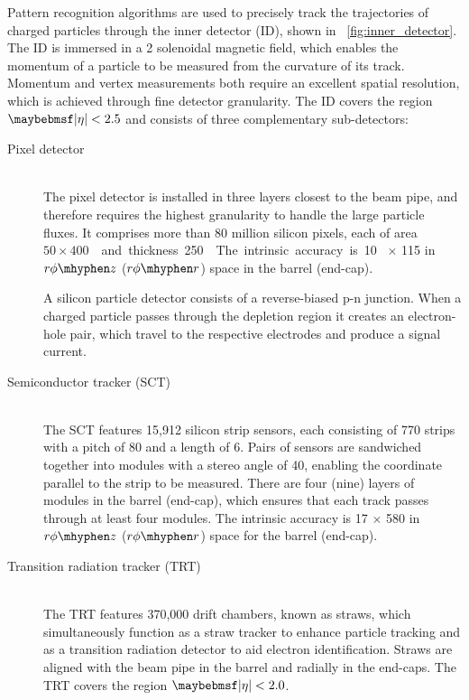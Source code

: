 Pattern recognition algorithms are used to precisely track the trajectories of charged 
particles through the inner detector (ID), shown in \Figure~\ref{fig:inner_detector}. The 
ID is immersed in a \unit{2}{\tesla} solenoidal magnetic field, which enables the 
momentum of a particle to be measured from the curvature of its track. Momentum and 
vertex measurements both require an excellent spatial resolution, which is achieved 
through fine detector granularity. The ID covers the region $\mods{\eta} < 2.5$ and 
consists of three complementary sub-detectors:
\clearpage
\begin{description}
\item[Pixel detector] \hfill \\
	The pixel detector is installed in three layers closest to the beam pipe, and 
	therefore requires the highest granularity to handle the large particle fluxes.
	It comprises more than 80 million silicon pixels, each of area 
	\unit{$50 \times 400$}{\micro\metre\squared} and thickness \unit{250}{\micro\metre}. 
	The intrinsic accuracy is \unit{10}{\micro\metre}$\,\times\,$\unit{115}{\micro\metre} 
	in $r\phi \mhyphen z$ ($r\phi \mhyphen r$) space in the barrel (end-cap).

	A silicon particle detector consists of a reverse-biased p-n junction. When a charged
	particle passes through the depletion region it creates an electron-hole pair, which 
	travel to the respective electrodes and produce a signal current.
\item[Semiconductor tracker (SCT)] \hfill \\
	The SCT features 15,912 silicon strip sensors, each consisting of 770 strips 
	with a pitch of \unit{80}{\micro\metre} and a length of \unit{6}{\centi\metre}. Pairs 
	of sensors are sandwiched together into modules with a stereo angle of 
	\unit{40}{\milli\radian}, enabling the coordinate parallel to the strip to be 
	measured. There are four (nine) layers of modules in the barrel (end-cap), which 
	ensures that each track passes through at least four modules. 
	The intrinsic accuracy is \unit{17}{\micro\metre}$\,\times\,$\unit{580}{\micro\metre} 
	in $r\phi \mhyphen z$ ($r\phi \mhyphen r$) space for the barrel (end-cap).
\item[Transition radiation tracker (TRT)] \hfill \\
	The TRT features 370,000 drift chambers, known as straws, which simultaneously 
	function as a straw tracker to enhance particle tracking and as a transition 
	radiation detector to aid electron identification. Straws are aligned with the beam 
	pipe in the barrel and radially in the end-caps. The TRT covers the region 
	$\mods{\eta} < 2.0$.


\end{description}
